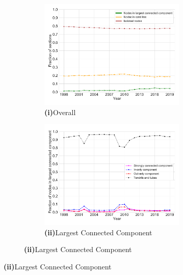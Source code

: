 \documentclass[varwidth, border=0pt]{standalone}
\begin{document}
\begin{figure}
\vspace*{6pt}

\begin{subfigure}{\linewidth}
	\begin{multicols}{2}
		\centering
		\begin{subfigure}{\linewidth}
			\includegraphics[width=\linewidth]{../../graphics/connectivity-development-regulations-only-de.pdf}
			\caption*{\textbf{\textsf{(i)}}\quad Overall}
		\end{subfigure}
		\newpage
		\begin{subfigure}{\linewidth}
			\includegraphics[width=\linewidth]{../../graphics/connectivity-lcc-regulations-only-de.pdf}
			\caption*{\textbf{\textsf{(ii)}}\quad Largest Connected Component}
		\end{subfigure}	
	\end{multicols}
	\vspace*{-6pt}
\end{subfigure}
	\end{figure}
	
\end{document}
